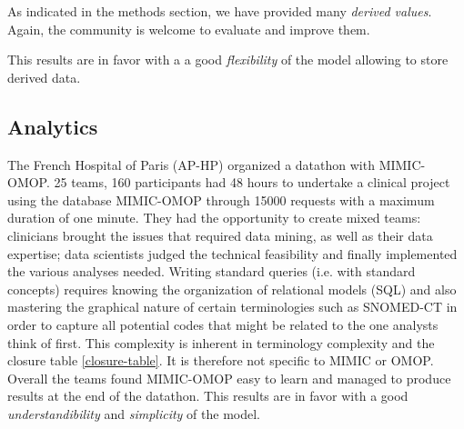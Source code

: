 As indicated in the methods section, we have provided many \emph{derived values}. 
Again, the community is welcome to evaluate and improve them.   

This results are in favor with a a good \textit{flexibility} of the model
allowing to store derived data.

%
%

\subsection{Analytics}

%
%

The French Hospital of Paris (AP-HP) organized a datathon with MIMIC-OMOP. 
25 teams, 160 participants had 48 hours to undertake a clinical project using 
the database MIMIC-OMOP through 15000 requests with a maximum duration of
one minute. They had the opportunity to create mixed teams: clinicians brought 
the issues that required data mining, as well as their data expertise; 
data scientists judged the technical feasibility and finally implemented the 
various analyses needed. Writing standard queries (i.e. with standard concepts) 
requires knowing the organization of relational models (SQL) and also mastering 
the graphical nature of certain terminologies such as SNOMED-CT in order to 
capture all potential codes that might be related to the one analysts think of 
first. This complexity is inherent in terminology complexity and the closure
table \ref{closure-table}. It is therefore not specific to MIMIC or OMOP.
Overall the teams found MIMIC-OMOP easy to learn and managed to produce results
at the end of the datathon.
This results are in favor with a good \textit{understandibility} and
\textit{simplicity} of the model.

